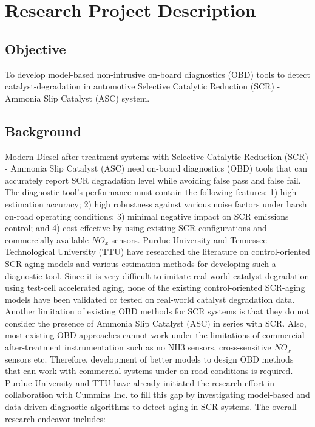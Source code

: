 \section{Research Project Description}

\subsection{Objective}
To develop model-based non-intrusive on-board diagnostics (OBD) tools to detect
catalyst-degradation in automotive Selective Catalytic Reduction (SCR) - Ammonia
Slip Catalyst (ASC) system.

\subsection{Background}
Modern Diesel after-treatment systems with Selective Catalytic Reduction (SCR)
- Ammonia Slip Catalyst (ASC) need on-board diagnostics (OBD) tools that can
accurately report SCR degradation level while avoiding false pass and false
fail. The diagnostic tool's performance must contain the following features: 1)
high estimation accuracy; 2) high robustness against various noise factors
under harsh on-road operating conditions; 3) minimal negative impact on SCR
emissions control; and 4) cost-effective by using existing SCR configurations
and commercially available $NO_x$ sensors. Purdue University and Tennessee
Technological University (TTU) have researched the literature on
control-oriented SCR-aging models and various estimation methods for developing
such a diagnostic tool. Since it is very difficult to imitate real-world
catalyst degradation using test-cell accelerated aging, none of the existing
control-oriented SCR-aging models have been validated or tested on real-world
catalyst degradation data. Another limitation of existing OBD methods for SCR
systems is that they do not consider the presence of Ammonia Slip Catalyst
(ASC) in series with SCR. Also, most existing OBD approaches cannot work under
the limitations of commercial after-treatment instrumentation such as no NH3
sensors, cross-sensitive $NO_x$ sensors etc. Therefore, development of better
models to design OBD methods that can work with commercial systems under
on-road conditions is required. Purdue University and TTU have already
initiated the research effort in collaboration with Cummins Inc. to fill this
gap by investigating model-based and data-driven diagnostic algorithms to
detect aging in SCR systems. The overall research endeavor includes:

